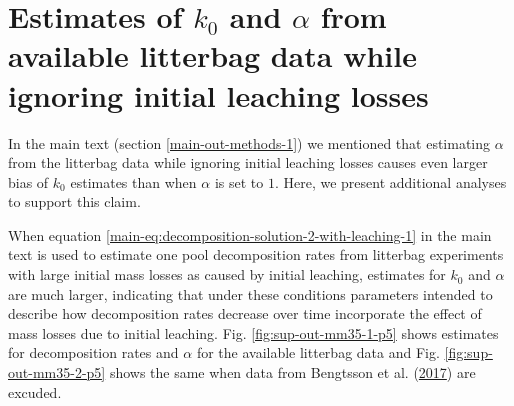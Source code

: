\documentclass[
  12pt,
]{article}
\begin{document}
\hypertarget{sup-2}{%
\section{\texorpdfstring{Estimates of \(k_0\) and \(\alpha\) from available litterbag data while ignoring initial leaching losses}{Estimates of k\_0 and \textbackslash alpha from available litterbag data while ignoring initial leaching losses}}\label{sup-2}}

In the main text (section \ref{main-out-methods-1}) we mentioned that estimating \(\alpha\) from the litterbag data while ignoring initial leaching losses causes even larger bias of \(k_0\) estimates than when \(\alpha\) is set to \(1\). Here, we present additional analyses to support this claim.

When equation \ref{main-eq:decomposition-solution-2-with-leaching-1} in the main text is used to estimate one pool decomposition rates from litterbag experiments with large initial mass losses as caused by initial leaching, estimates for \(k_0\) and \(\alpha\) are much larger, indicating that under these conditions parameters intended to describe how decomposition rates decrease over time incorporate the effect of mass losses due to initial leaching. Fig. \ref{fig:sup-out-mm35-1-p5} shows estimates for decomposition rates and \(\alpha\) for the available litterbag data and Fig. \ref{fig:sup-out-mm35-2-p5} shows the same when data from Bengtsson et al. (\protect\hyperlink{ref-Bengtsson.2017}{2017}) are excuded.
\end{document}
